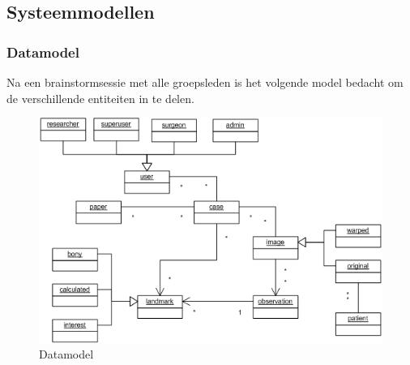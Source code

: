 \subsection{Systeemmodellen}
\subsubsection{Datamodel}
Na een brainstormsessie met alle groepsleden is het volgende model bedacht om de verschillende entiteiten in te delen.
\begin{figure}[htp]
\begin{center}
	\includegraphics[scale=0.65]{brainstorm_klassediagram}
\caption{Datamodel}
\label{default}
\end{center}
\end{figure}


